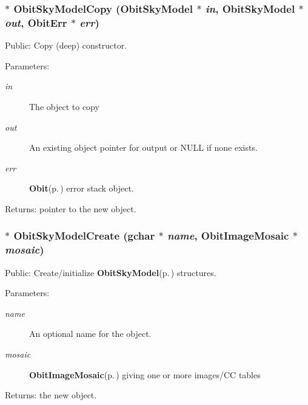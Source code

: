 \subsubsection{$\ast$ Obit\-Sky\-Model\-Copy ({\bf Obit\-Sky\-Model} $\ast$ {\em in}, {\bf Obit\-Sky\-Model} $\ast$ {\em out}, {\bf Obit\-Err} $\ast$ {\em err})}\label{ObitSkyModel_8h_a55}


Public: Copy (deep) constructor. 

\begin{Desc}
\item[Parameters:]
\begin{description}
\item[{\em in}]The object to copy \item[{\em out}]An existing object pointer for output or NULL if none exists. \item[{\em err}]{\bf Obit}{\rm (p.\,\pageref{structObit})} error stack object. \end{description}
\end{Desc}
\begin{Desc}
\item[Returns:]pointer to the new object. \end{Desc}
\subsubsection{$\ast$ Obit\-Sky\-Model\-Create (gchar $\ast$ {\em name}, {\bf Obit\-Image\-Mosaic} $\ast$ {\em mosaic})}\label{ObitSkyModel_8h_a50}


Public: Create/initialize {\bf Obit\-Sky\-Model}{\rm (p.\,\pageref{structObitSkyModel})} structures. 

\begin{Desc}
\item[Parameters:]
\begin{description}
\item[{\em name}]An optional name for the object. \item[{\em mosaic}]{\bf Obit\-Image\-Mosaic}{\rm (p.\,\pageref{structObitImageMosaic})} giving one or more images/CC tables \end{description}
\end{Desc}
\begin{Desc}
\item[Returns:]the new object. \end{Desc}
